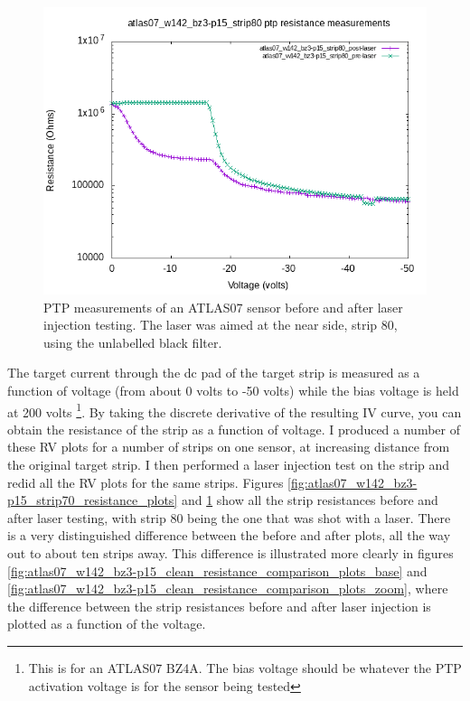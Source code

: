 \documentclass{report}
\begin{document}
            \begin{figure}[h] 
                \includegraphics[height=.4\textheight]{atlas07_w142_bz3-p15_strip80_resistance_plots}
                \centering
                \caption{ PTP measurements of an ATLAS07 sensor before and after laser injection testing. The laser was aimed at the near side, strip 80, using the unlabelled black filter. }
                \label{fig:atlas07_w142_bz3-p15_strip80_resistance_plots}
            \end{figure}

            The target current through the dc pad of the target strip is measured as a function of voltage (from about 0 volts to -50 volts) while the bias voltage is held at 200 volts \footnote{This is for an ATLAS07 BZ4A. The bias voltage should be whatever the PTP activation voltage is for the sensor being tested}. By taking the discrete derivative of the resulting IV curve, you can obtain the resistance of the strip as a function of voltage. I produced a number of these RV plots for a number of strips on one sensor, at increasing distance from the original target strip. I then performed a laser injection test on the strip and redid all the RV plots for the same strips. Figures \ref{fig:atlas07_w142_bz3-p15_strip70_resistance_plots} and \ref{fig:atlas07_w142_bz3-p15_strip80_resistance_plots} show all the strip resistances before and after laser testing, with strip 80 being the one that was shot with a laser. There is a very distinguished difference between the before and after plots, all the way out to about ten strips away. This difference is illustrated more clearly in figures \ref{fig:atlas07_w142_bz3-p15_clean_resistance_comparison_plots_base} and \ref{fig:atlas07_w142_bz3-p15_clean_resistance_comparison_plots_zoom}, where the difference between the strip resistances before and after laser injection is plotted as a function of the voltage.
\end{document}
